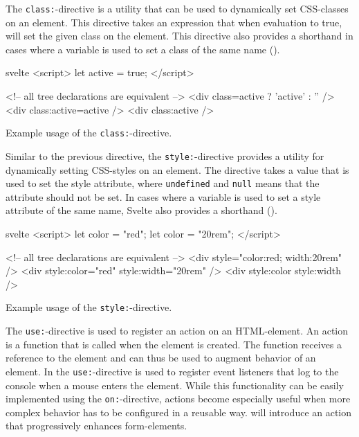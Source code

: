 The \texttt{class:}-directive is a utility that can be used to dynamically set CSS-classes on an element. This directive takes an expression that when evaluation to true, will set the given class on the element. This directive also provides a shorthand in cases where a variable is used to set a class of the same name ().
\begin{listing}[H]
\begin{myminted}{svelte}{}
<script>
  let active = true;
</script>

<!-- all tree declarations are equivalent -->
<div class={active ? 'active' : ''} />
<div class:active={active} />
<div class:active />
\end{myminted}
\caption{Example usage of the \texttt{class:}-directive.}
\label{fig:svelte-class-directive}
\end{listing}

Similar to the previous directive, the \texttt{style:}-directive provides a utility for dynamically setting CSS-styles on an element. The directive takes a value that is used to set the style attribute, where \texttt{undefined} and \texttt{null} means that the attribute should not be set. In cases where a variable is used to set a style attribute of the same name, Svelte also provides a shorthand ().

\begin{listing}[H]
\begin{myminted}{svelte}{}
<script>
  let color = "red";
  let color = "20rem";
</script>

<!-- all tree declarations are equivalent -->
<div style="color:red; width:20rem" />
<div style:color="red" style:width="20rem" />
<div style:color style:width />
\end{myminted}
\caption{Example usage of the \texttt{style:}-directive.}
\label{fig:svelte-style-directive}
\end{listing}

The \texttt{use:}-directive is used to register an action on an HTML-element. An action is a function that is called when the element is created. The function receives a reference to the element and can thus be used to augment behavior of an element. In  the \texttt{use:}-directive is used to register event listeners that log to the console when a mouse enters the element. While this functionality can be easily implemented using the \texttt{on:}-directive, actions become especially useful when more complex behavior has to be configured in a reusable way.  will introduce an action that progressively enhances form-elements.

